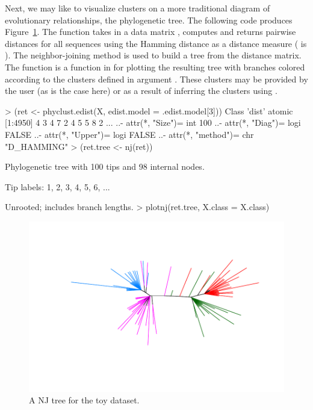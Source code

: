 Next, we may like to visualize clusters on a more traditional diagram of evolutionary relationships, the phylogenetic tree.
The following code produces Figure~\ref{fig:toynj}.
The  function takes in a data
matrix , computes and returns pairwise distances for all sequences
using the Hamming distance
as a distance measure ( is ).
The neighbor-joining method \citep{Saitou1987} is used to build a tree from
the distance matrix. The function  is a function in  for plotting
the resulting tree with branches colored according to the clusters defined in argument .
These clusters may be provided by the user (as is the case here) or as a result of inferring the clusters using .
\begin{Code}
> (ret <- phyclust.edist(X, edist.model = .edist.model[3]))
Class 'dist'  atomic [1:4950] 4 3 4 7 2 4 5 5 8 2 ...
  ..- attr(*, "Size")= int 100
  ..- attr(*, "Diag")= logi FALSE
  ..- attr(*, "Upper")= logi FALSE
  ..- attr(*, "method")= chr "D_HAMMING"
> (ret.tree <- nj(ret))

Phylogenetic tree with 100 tips and 98 internal nodes.

Tip labels:
        1, 2, 3, 4, 5, 6, ...

Unrooted; includes branch lengths.
> plotnj(ret.tree, X.class = X.class)
\end{Code}
\begin{figure}[h]
\begin{center}
\includegraphics[width=5.0in]{./phyclust-include/f-toynj}
\caption{A NJ tree for the toy dataset.}
\label{fig:toynj}
\end{center}
\end{figure}




